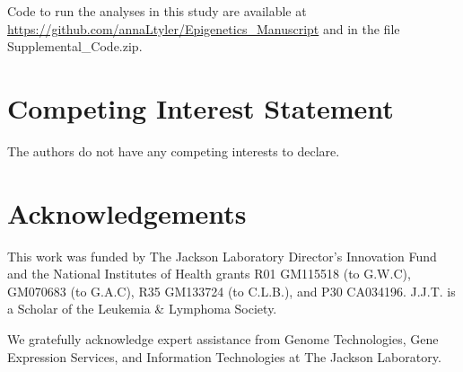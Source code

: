 \documentclass[
  11pt,
]{article}
\begin{document}
Code to run the analyses in this study are available at
\url{https://github.com/annaLtyler/Epigenetics_Manuscript} and in the
file Supplemental\_Code.zip.

\hypertarget{competing-interest-statement}{%
\section{Competing Interest
Statement}\label{competing-interest-statement}}

The authors do not have any competing interests to declare.

\hypertarget{acknowledgements}{%
\section{Acknowledgements}\label{acknowledgements}}

This work was funded by The Jackson Laboratory Director's Innovation
Fund and the National Institutes of Health grants R01 GM115518 (to
G.W.C), GM070683 (to G.A.C), R35 GM133724 (to C.L.B.), and P30 CA034196.
J.J.T. is a Scholar of the Leukemia \& Lymphoma Society.

We gratefully acknowledge expert assistance from Genome Technologies,
Gene Expression Services, and Information Technologies at The Jackson
Laboratory.

\pagebreak


\end{document}

